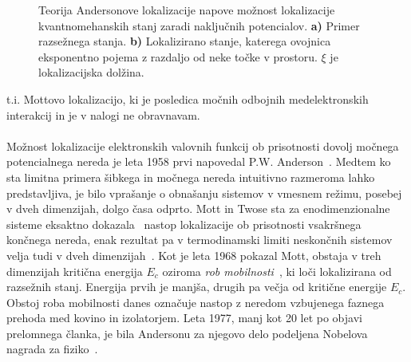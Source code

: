 \documentclass[10pt,a4paper]{article}
\begin{document}
\begin{minipage}[t]{0.4\textwidth}
\begin{figure}[H]
\caption{Teorija Andersonove lokalizacije napove možnost lokalizacije kvantnomehanskih stanj zaradi naključnih potencialov. \textbf{a)} Primer razsežnega stanja. \textbf{b)} Lokalizirano stanje, katerega ovojnica eksponentno pojema z razdaljo od neke točke v prostoru. $\xi$ je lokalizacijska dolžina. 
}
\label{fig:dif_loc_ext}
\end{figure}
\end{minipage}
 t.i. Mottovo lokalizacijo, ki je posledica močnih odbojnih medelektronskih interakcij in je v nalogi ne obravnavam. \\\\
Možnost lokalizacije elektronskih valovnih funkcij ob prisotnosti dovolj močnega potencialnega nereda je leta 1958 prvi napovedal P.W. Anderson~\cite{anderson1958absence}. Medtem ko sta limitna primera šibkega in močnega nereda intuitivno razmeroma lahko predstavljiva, je bilo vprašanje o obnašanju sistemov v vmesnem režimu, posebej v dveh dimenzijah, dolgo časa odprto. Mott in Twose sta za enodimenzionalne sisteme eksaktno dokazala~\cite{doi:10.1080/00018736100101271} nastop lokalizacije ob prisotnosti vsakršnega končnega nereda, enak rezultat pa  v termodinamski limiti neskončnih sistemov velja tudi v dveh dimenzijah~\cite{abrahams1979scaling}. Kot je leta 1968 pokazal Mott, obstaja v treh dimenzijah kritična energija $E_c$ oziroma \emph{rob mobilnosti}~\cite{mott1990metal}, ki loči lokalizirana od razsežnih stanj. Energija prvih je manjša, drugih pa večja od kritične energije $E_c$. Obstoj roba mobilnosti danes označuje nastop z neredom vzbujenega faznega prehoda med kovino in izolatorjem. Leta 1977, manj kot 20 let po objavi prelomnega članka, je bila Andersonu za njegovo delo podeljena Nobelova nagrada za fiziko~\cite{anderson1978local}.
\end{document}
